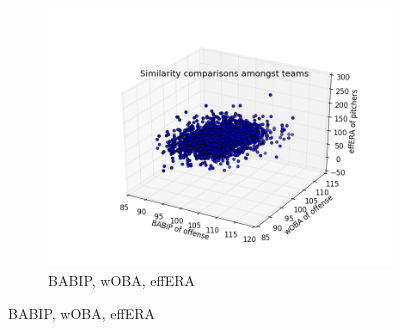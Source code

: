 \documentclass[12pt]{article}
\numberwithin{equation}{subsection}
\begin{document}
\begin{figure}[H]
\begin{subfigure}[b]{0.33\linewidth}
    \includegraphics[width=0.9\linewidth]{Sim3} 
    \caption{BABIP, wOBA, effERA} 
    \label{fig5:c} 
    \vspace{4ex}
  \end{subfigure}
  

\end{figure}
\end{document}
